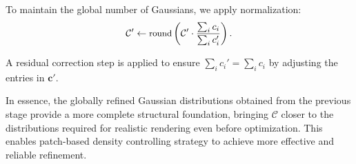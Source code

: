 To maintain the global number of Gaussians, we apply normalization:
\begin{equation}
\small
\mathcal{C'} \leftarrow \text{round}\left( \mathcal{C'} \cdot \frac{\sum_i c_i}{\sum_i c_i'} \right).
\end{equation}

A residual correction step is applied to ensure $\sum_i c_i' = \sum_i c_i$ by adjusting the entries in $\mathbf{c'}$.

In essence, the globally refined Gaussian distributions obtained from the previous stage provide a more complete structural foundation, bringing $\mathcal{C}$ closer to the distributions required for realistic rendering even before optimization. This enables patch-based
density controlling strategy to achieve more effective and reliable refinement.

